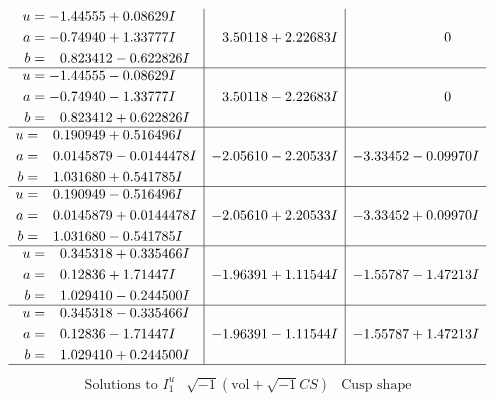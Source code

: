 \documentclass[1p]{elsarticle_modified}
\theoremstyle{definition}
\newcommand{\I}{\sqrt{-1}}
\begin{document}
$$\begin{array}{c|c|c}
\begin{aligned}
u &= -1.44555 + 0.08629 I \\
a &= -0.74940 + 1.33777 I \\
b &= \phantom{-}0.823412 - 0.622826 I\end{aligned}
 & \phantom{-}3.50118 + 2.22683 I & \phantom{-0.000000 } 0 \\ \hline\begin{aligned}
u &= -1.44555 - 0.08629 I \\
a &= -0.74940 - 1.33777 I \\
b &= \phantom{-}0.823412 + 0.622826 I\end{aligned}
 & \phantom{-}3.50118 - 2.22683 I & \phantom{-0.000000 } 0 \\ \hline\begin{aligned}
u &= \phantom{-}0.190949 + 0.516496 I \\
a &= \phantom{-}0.0145879 - 0.0144478 I \\
b &= \phantom{-}1.031680 + 0.541785 I\end{aligned}
 & -2.05610 - 2.20533 I & -3.33452 - 0.09970 I \\ \hline\begin{aligned}
u &= \phantom{-}0.190949 - 0.516496 I \\
a &= \phantom{-}0.0145879 + 0.0144478 I \\
b &= \phantom{-}1.031680 - 0.541785 I\end{aligned}
 & -2.05610 + 2.20533 I & -3.33452 + 0.09970 I \\ \hline\begin{aligned}
u &= \phantom{-}0.345318 + 0.335466 I \\
a &= \phantom{-}0.12836 + 1.71447 I \\
b &= \phantom{-}1.029410 - 0.244500 I\end{aligned}
 & -1.96391 + 1.11544 I & -1.55787 - 1.47213 I \\ \hline\begin{aligned}
u &= \phantom{-}0.345318 - 0.335466 I \\
a &= \phantom{-}0.12836 - 1.71447 I \\
b &= \phantom{-}1.029410 + 0.244500 I\end{aligned}
 & -1.96391 - 1.11544 I & -1.55787 + 1.47213 I\\
 \hline 
 \end{array}$$\newpage$$\begin{array}{c|c|c}  
\text{Solutions to }I^u_{1}& \I (\text{vol} + \sqrt{-1}CS) & \text{Cusp shape}\\

\end{array}$$
\end{document}
